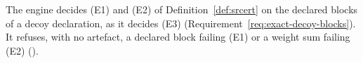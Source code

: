 
\begin{requirement}\label{req:decoy-ensemble-conditions}
The engine decides (E1) and (E2) of Definition~\ref{def:srcert} on the declared
blocks of a decoy declaration, as it decides (E3)
(Requirement~\ref{req:exact-decoy-blocks}). It refuses, with no artefact, a
declared block failing (E1) or a weight sum failing (E2)
().
\end{requirement}
